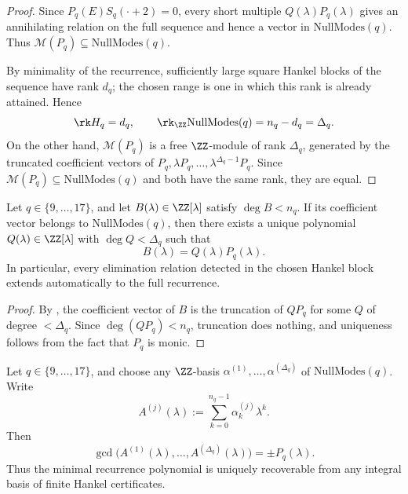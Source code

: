 \begin{proof}
Since \(P_q(E)S_q(\cdot+2)=0\), every short multiple \(Q(\lambda)P_q(\lambda)\)
gives an annihilating relation on the full sequence and hence a vector in
\(\mathrm{NullModes}(q)\).  Thus \(\mathcal M(P_q)\subseteq \mathrm{NullModes}(q)\).

By minimality of the recurrence, sufficiently large square Hankel blocks of the
sequence have rank \(d_q\); the chosen range is one in which this rank is
already attained.
Hence
\[
  \rk H_q=d_q,
  \qquad
  \rk_{\ZZ}\mathrm{NullModes}(q)=n_q-d_q=\Delta_q.
\]
On the other hand, \(\mathcal M(P_q)\) is a free \(\ZZ\)-module of rank
\(\Delta_q\), generated by the truncated coefficient vectors of
\(P_q,\lambda P_q,\dots,\lambda^{\Delta_q-1}P_q\).  Since
\(\mathcal M(P_q)\subseteq \mathrm{NullModes}(q)\) and both have the same rank,
they are equal.
\end{proof}

\begin{corollary}
\label{cor:no-spurious-elimination}
Let \(q\in\{9,\dots,17\}\), and let \(B(\lambda)\in\ZZ[\lambda]\) satisfy
\(\deg B<n_q\).  If its coefficient vector belongs to \(\mathrm{NullModes}(q)\),
then there exists a unique polynomial \(Q(\lambda)\in\ZZ[\lambda]\) with
\(\deg Q<\Delta_q\) such that
\[
  B(\lambda)=Q(\lambda)P_q(\lambda).
\]
In particular, every elimination relation detected in the chosen Hankel block
extends automatically to the full recurrence.
\end{corollary}

\begin{proof}
By , the coefficient vector of \(B\) is the
truncation of \(QP_q\) for some \(Q\) of degree \(<\Delta_q\).  Since
\(\deg(QP_q)<n_q\), truncation does nothing, and uniqueness follows from the
fact that \(P_q\) is monic.
\end{proof}

\begin{corollary}
\label{cor:gcd-recovers-minpoly}
Let \(q\in\{9,\dots,17\}\), and choose any \(\ZZ\)-basis
\(\alpha^{(1)},\dots,\alpha^{(\Delta_q)}\) of \(\mathrm{NullModes}(q)\).  Write
\[
  A^{(j)}(\lambda):=\sum_{k=0}^{n_q-1}\alpha^{(j)}_k\lambda^k.
\]
Then
\[
  \gcd\bigl(A^{(1)}(\lambda),\dots,A^{(\Delta_q)}(\lambda)\bigr)=\pm P_q(\lambda).
\]
Thus the minimal recurrence polynomial is uniquely recoverable from any integral
basis of finite Hankel certificates.
\end{corollary}


